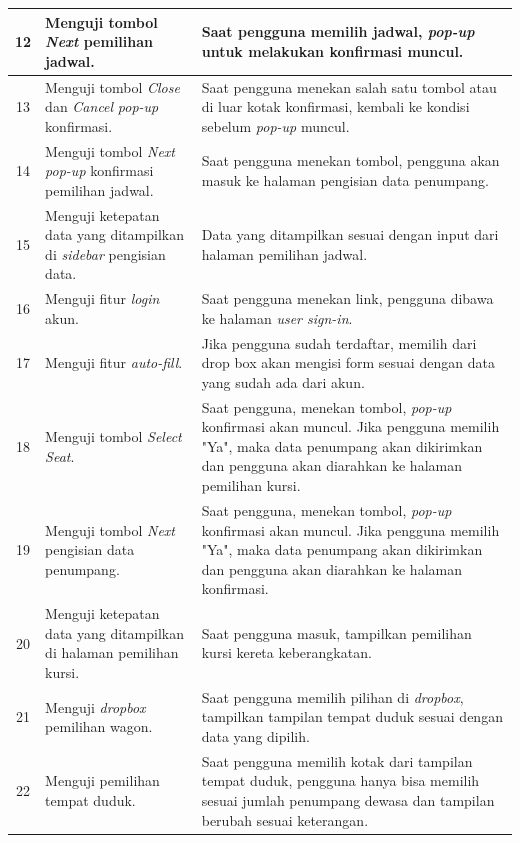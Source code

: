 \begin{longtable}[c]{|c|p{3cm}|p{8cm}|}
        \hline
        12 & Menguji tombol \textit{Next} pemilihan jadwal. & Saat pengguna memilih jadwal, \textit{pop-up} untuk melakukan konfirmasi muncul.\\
        \hline
        13 & Menguji tombol \textit{Close} dan \textit{Cancel} \textit{pop-up} konfirmasi. & Saat pengguna menekan salah satu tombol atau di luar kotak konfirmasi, kembali ke kondisi sebelum \textit{pop-up} muncul.\\
        \hline
        14 & Menguji tombol \textit{Next pop-up} konfirmasi pemilihan jadwal. & Saat pengguna menekan tombol, pengguna akan masuk ke halaman pengisian data penumpang.\\
        \hline
        15 & Menguji ketepatan data yang ditampilkan di \textit{sidebar} pengisian data. & Data yang ditampilkan sesuai dengan input dari halaman pemilihan jadwal.\\
        \hline
        16 & Menguji fitur \textit{login} akun. & Saat pengguna menekan link, pengguna dibawa ke halaman \textit{user sign-in}.\\
        \hline
        17 & Menguji fitur \textit{auto-fill}. & Jika pengguna sudah terdaftar, memilih dari drop box akan mengisi form sesuai dengan data yang sudah ada dari akun.\\
        \hline
        18 & Menguji tombol \textit{Select Seat}. & Saat pengguna, menekan tombol, \textit{pop-up} konfirmasi akan muncul. Jika pengguna memilih "Ya", maka data penumpang akan dikirimkan dan pengguna akan diarahkan ke halaman pemilihan kursi.\\
        \hline
        19 & Menguji tombol \textit{Next} pengisian data penumpang. & Saat pengguna, menekan tombol, \textit{pop-up} konfirmasi akan muncul. Jika pengguna memilih "Ya", maka data penumpang akan dikirimkan dan pengguna akan diarahkan ke halaman konfirmasi.\\
        \hline
        20 & Menguji ketepatan data yang ditampilkan di halaman pemilihan kursi. & Saat pengguna masuk, tampilkan pemilihan kursi kereta keberangkatan.\\
        \hline
        21 & Menguji \textit{dropbox} pemilihan wagon. & Saat pengguna memilih pilihan di \textit{dropbox}, tampilkan tampilan tempat duduk sesuai dengan data yang dipilih.\\
        \hline
        22 & Menguji pemilihan tempat duduk. & Saat pengguna memilih kotak dari tampilan tempat duduk, pengguna hanya bisa memilih sesuai jumlah penumpang dewasa dan tampilan berubah sesuai keterangan.\\

\end{longtable}
